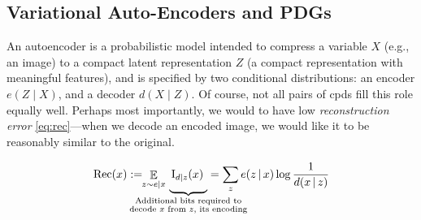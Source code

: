 \documentclass[twoside]{article}
\makeatletter
\theoremstyle{plain}
\theoremstyle{definition}
\let\H\relax
\DeclareMathOperator{\H}{\mathrm{H}} %
\DeclareMathOperator*{\Ex}{\mathbb{E}} %
\newcommand{\datadist}[1]{\Pr\nolimits_{#1}}
\newcommand\Inc{\mathit{Inc}}
\newcommand\aar{\@ifstar\aar@one@star\aar@plain}
\newcommand\aar@one@star{\@ifstar\aar@resize{\aar@plain*}}
\newcommand\aar@resize[1]{\sbox{\aar@content}{#1}\scaleleftright[3.8ex]
		{\Biggl\langle\!\!\!\!\Biggl\langle}{\usebox{\aar@content}}
		{\Biggr\rangle\!\!\!\!\Biggr\rangle}}
\makeatother
\begin{document}


\subsection{Variational Auto-Encoders and PDGs}

An autoencoder is a probabilistic model intended to compress a variable $X$ (e.g., an image) to a compact latent representation $Z$ (a compact representation with meaningful features), and is specified by two conditional distributions:
an encoder $e(Z \mid X)$, and a decoder $d(X \mid Z)$.
Of course, not all pairs of cpds fill this role equally well.
Perhaps most importantly, we would to have low \emph{reconstruction error} \eqref{eq:rec}---when we decode an encoded image, we would like it to be reasonably similar to the original.

\begin{equation}
 \mathrm{Rec}(x) := \!\! \Ex_{z \sim e \mid x} \, \underbrace{\,\mathrm I_{d\mid z}(x)~\vphantom{\bigg|}}_{\mathclap{\substack{\text{Additional bits required to}\\\text{decode $x$ from $z$, its encoding}}}}
	= \sum_z e(z \,|\, x) \log \frac1{d(x \,|\, z)}\label{eq:rec}
\end{equation}
\end{document}
